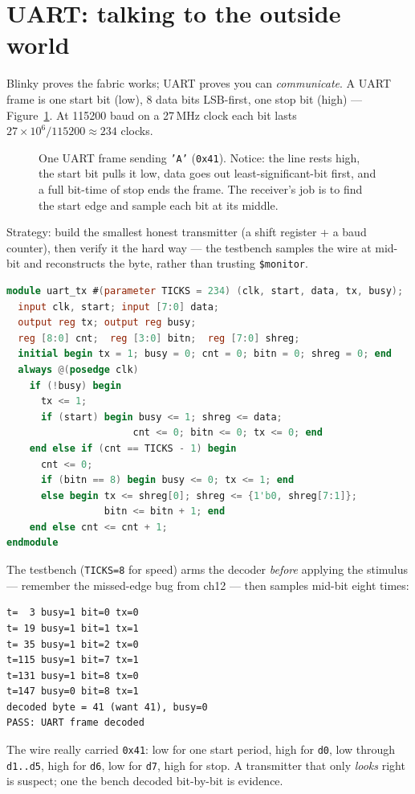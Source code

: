 \section{UART: talking to the outside world}

Blinky proves the fabric works; UART proves you can \emph{communicate}. A UART
frame is one start bit (low), 8 data bits LSB-first, one stop bit (high) ---
Figure~\ref{fig:uart}. At 115200 baud on a 27\,MHz clock each bit lasts
$27\times10^6/115200 \approx 234$ clocks.

\begin{figure}[htbp]\centering

\caption{One UART frame sending \texttt{'A'} (\texttt{0x41}). Notice: the line
rests high, the start bit pulls it low, data goes out least-significant-bit
first, and a full bit-time of stop ends the frame. The receiver's job is to
find the start edge and sample each bit at its middle.}
\label{fig:uart}
\end{figure}

\begin{example}
Strategy: build the smallest honest transmitter (a shift register + a baud
counter), then verify it the hard way --- the testbench samples the wire at
mid-bit and reconstructs the byte, rather than trusting \texttt{\$monitor}.

\begin{lstlisting}[language=Verilog]
module uart_tx #(parameter TICKS = 234) (clk, start, data, tx, busy);
  input clk, start; input [7:0] data;
  output reg tx; output reg busy;
  reg [8:0] cnt;  reg [3:0] bitn;  reg [7:0] shreg;
  initial begin tx = 1; busy = 0; cnt = 0; bitn = 0; shreg = 0; end
  always @(posedge clk)
    if (!busy) begin
      tx <= 1;
      if (start) begin busy <= 1; shreg <= data;
                      cnt <= 0; bitn <= 0; tx <= 0; end
    end else if (cnt == TICKS - 1) begin
      cnt <= 0;
      if (bitn == 8) begin busy <= 0; tx <= 1; end
      else begin tx <= shreg[0]; shreg <= {1'b0, shreg[7:1]};
                 bitn <= bitn + 1; end
    end else cnt <= cnt + 1;
endmodule
\end{lstlisting}

The testbench (\texttt{TICKS=8} for speed) arms the decoder \emph{before}
applying the stimulus --- remember the missed-edge bug from ch12 --- then
samples mid-bit eight times:

\begin{lstlisting}
t=  3 busy=1 bit=0 tx=0
t= 19 busy=1 bit=1 tx=1
t= 35 busy=1 bit=2 tx=0
t=115 busy=1 bit=7 tx=1
t=131 busy=1 bit=8 tx=0
t=147 busy=0 bit=8 tx=1
decoded byte = 41 (want 41), busy=0
PASS: UART frame decoded
\end{lstlisting}

The wire really carried \texttt{0x41}: low for one start period, high for
\texttt{d0}, low through \texttt{d1..d5}, high for \texttt{d6}, low for
\texttt{d7}, high for stop. A transmitter that only \emph{looks} right is
suspect; one the bench decoded bit-by-bit is evidence.
\end{example}

